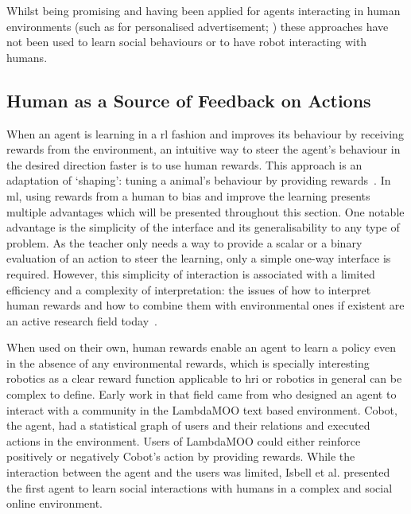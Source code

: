 	
	Whilst being promising and having been applied for agents interacting in human environments (such as for personalised advertisement;  \citealt{theocharous2015personalized})	these approaches have not been used to learn social behaviours or to have robot interacting with humans.

\subsection{Human as a Source of Feedback on Actions} \label{ssec:back_feedback}

When an agent is learning in a \gls{rl} fashion and improves its behaviour by receiving rewards from the environment, an intuitive way to steer the agent's behaviour in the desired direction faster is to use human rewards. This approach is an adaptation of `shaping': tuning a animal's behaviour by providing rewards~\citep{bouton2007learning}. In \gls{ml}, using rewards from a human to bias and improve the learning presents multiple advantages which will be presented throughout this section. One notable advantage is the simplicity of the interface and its generalisability to any type of problem. As the teacher only needs a way to provide a scalar or a binary evaluation of an action to steer the learning, only a simple one-way interface is required.  However, this simplicity of interaction is associated with a limited efficiency and a complexity of interpretation: the issues of how to interpret human rewards and how to combine them with environmental ones if existent are an active research field today~\citep{knox2010combining}.

When used on their own, human rewards enable an agent to learn a policy even in the absence of any environmental rewards, which is specially interesting robotics as a clear reward function applicable to \gls{hri} or robotics in general can be complex to define. Early work in that field came from \cite{isbell2006cobot} who designed an agent to interact with a community in the LambdaMOO text based environment. Cobot, the agent, had a statistical graph of users and their relations and executed actions in the environment. Users of LambdaMOO could either reinforce positively or negatively Cobot's action by providing rewards. While the interaction between the agent and the users was limited, Isbell et al. presented the first agent to learn social interactions with humans in a complex and social online environment. 


